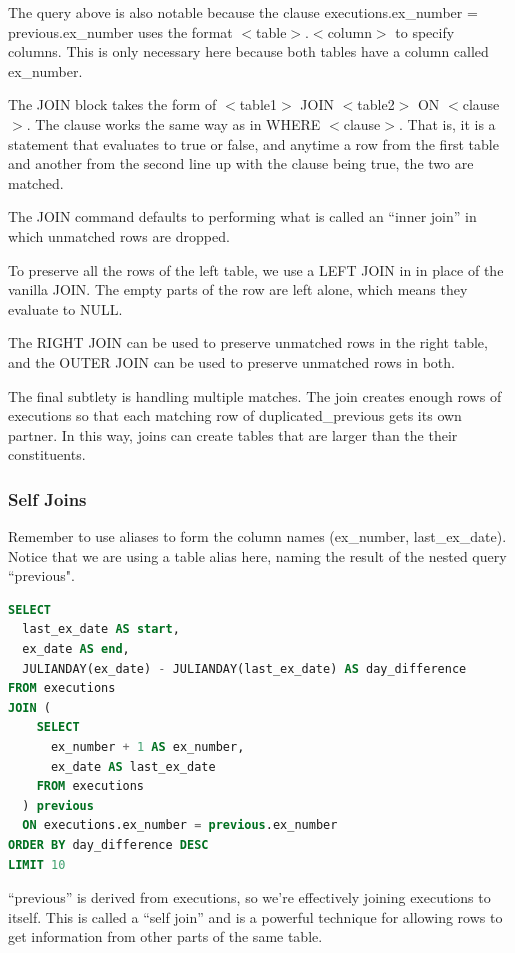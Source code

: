 \documentclass{article}
\begin{document}
The query above is also notable because the clause executions.ex\_number = previous.ex\_number uses the format $<$table$>$.$<$column$>$ to specify columns. This is only necessary here because both tables have a column called ex\_number.

The JOIN block takes the form of $<$table1$>$ JOIN $<$table2$>$ ON $<$clause$>$. The clause works the same way as in WHERE $<$clause$>$. That is, it is a statement that evaluates to true or false, and anytime a row from the first table and another from the second line up with the clause being true, the two are matched.

The JOIN command defaults to performing what is called an ``inner join” in which unmatched rows are dropped.

To preserve all the rows of the left table, we use a LEFT JOIN in in place of the vanilla JOIN. The empty parts of the row are left alone, which means they evaluate to NULL.

The RIGHT JOIN can be used to preserve unmatched rows in the right table, and the OUTER JOIN can be used to preserve unmatched rows in both.

The final subtlety is handling multiple matches. The join creates enough rows of executions so that each matching row of duplicated\_previous gets its own partner. In this way, joins can create tables that are larger than the their constituents.

\subsubsection{Self Joins }

Remember to use aliases to form the column names (ex\_number, last\_ex\_date). Notice that we are using a table alias here, naming the result of the nested query ``previous".

\vspace{8pt} \begin{lstlisting}[language=SQL]
SELECT
  last_ex_date AS start,
  ex_date AS end,
  JULIANDAY(ex_date) - JULIANDAY(last_ex_date) AS day_difference
FROM executions
JOIN (
    SELECT
      ex_number + 1 AS ex_number,
      ex_date AS last_ex_date
    FROM executions
  ) previous
  ON executions.ex_number = previous.ex_number
ORDER BY day_difference DESC
LIMIT 10
\end{lstlisting} \vspace{8pt}

``previous'' is derived from executions, so we’re effectively joining executions to itself. This is called a ``self join” and is a powerful technique for allowing rows to get information from other parts of the same table.
\end{document}
